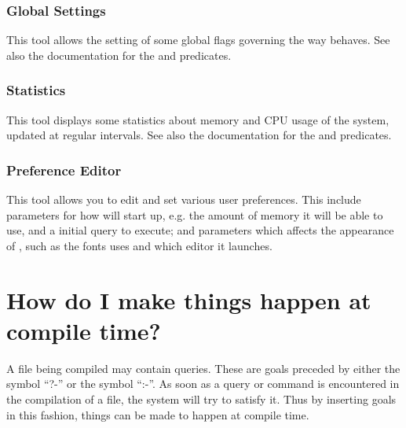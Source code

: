 \subsubsection{Global Settings}

This tool allows the setting of some global flags governing the way
{\eclipse} behaves.  See also the documentation for the
 and
 predicates.

\subsubsection{Statistics}

This tool displays some statistics about memory and CPU usage of the
{\eclipse} system, updated at regular intervals.  See also the
documentation for the
 and
predicates.

\subsubsection{Preference Editor}

This tool allows you to edit and set various user preferences. This
include parameters for how {\tkeclipse} will start up, e.g. the amount
of memory it will be able to use, and a initial query to execute; and
parameters which affects the appearance of {\tkeclipse}, such as the
fonts {\tkeclipse} uses and which editor it launches.


\section{How do I make things happen at compile time?}

A file being compiled may contain queries.  These are goals
 preceded by either the symbol ``?-'' or the symbol
``:-''.  As soon as a query or command is encountered in the
compilation of a file, the {\eclipse} system will try to satisfy it.
Thus by inserting goals in this fashion, things can be made to happen
at compile time.

